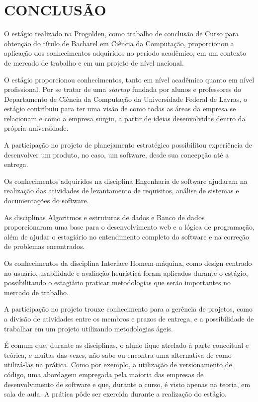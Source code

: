 \chapter{CONCLUSÃO}

O estágio realizado na Progolden, como trabalho de conclusão de Curso para obtenção do título de Bacharel em Ciência da Computação, proporcionou a aplicação dos conhecimentos adquiridos no período acadêmico, em um contexto de mercado de trabalho e em um projeto de nível nacional.

O estágio proporcionou conhecimentos, tanto em nível acadêmico quanto em nível profissional. Por se tratar de uma \textit{startup} fundada por alunos e professores do Departamento de Ciência da Computação da Universidade Federal de Lavras, o estágio contribuiu para ter uma visão de como todas as áreas da empresa se relacionam e como a empresa surgiu, a partir de ideias desenvolvidas dentro da própria universidade.

A participação no projeto de planejamento estratégico possibilitou experiência de desenvolver um produto, no caso, um software, desde sua concepção até a entrega. 

Os conhecimentos adquiridos na disciplina Engenharia de software ajudaram na realização das atividades de levantamento de requisitos, análise de sistemas e documentações do software.

As disciplinas Algoritmos e estruturas de dados e Banco de dados proporcionaram uma base para o desenvolvimento web e a lógica de programação, além de ajudar o estagiário no entendimento completo do software e na correção de problemas encontrados.

Os conhecimentos da disciplina Interface Homem-máquina, como design centrado no usuário, usabilidade e avaliação heurística foram aplicados durante o estágio, possibilitando o estagiário praticar metodologias que serão importantes no mercado de trabalho.

A participação no projeto trouxe conhecimento para a gerência de projetos, como a divisão de atividades entre os membros e prazos de entrega, e a possibilidade de trabalhar em um projeto utilizando metodologias ágeis.

É comum que, durante as disciplinas, o aluno fique atrelado à parte conceitual e teórica, e muitas das vezes, não sabe ou encontra uma alternativa de como utilizá-las na prática. Como por exemplo, a utilização de versionamento de código, uma abordagem empregada pela maioria das empresas de desenvolvimento de software e que, durante o curso, é visto apenas na teoria, em sala de aula. A prática pôde ser exercida durante a realização do estágio.


